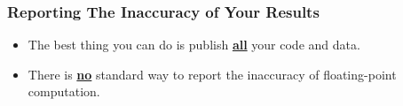 \begin{frame}

\frametitle{Reporting The Inaccuracy of Your Results}

\begin{itemize}

\item The best thing you can do is publish \textbf{\underline{all}} your code and data.

\item There is \textbf{\underline{no}} standard way to report the inaccuracy of
floating-point computation.

\end{itemize}

\end{frame}
